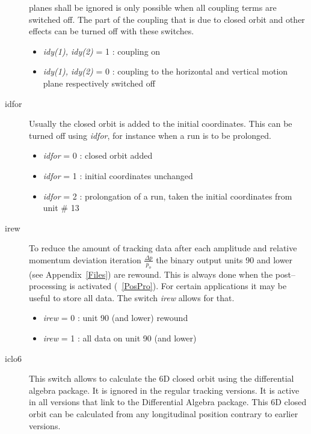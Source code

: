 \documentclass[a4paper,11pt]{report}
\begin{document}
\begin{description}
  planes shall be ignored is only possible when all coupling terms are
  switched off.  The part of the coupling that is due to closed orbit
  and other effects can be turned off with these switches.
 \begin{itemize}
 \item {\em idy(1), idy(2)} \/= 1 : coupling on
 \item {\em idy(1), idy(2)} \/= 0 : coupling to the horizontal and
   vertical motion plane respectively switched off
 \end{itemize}
\item [idfor] Usually the closed orbit is added to the initial
  coordinates. This can be turned off using {\em idfor}\/, for
  instance when a run is to be prolonged.
 \begin{itemize}
 \item {\em idfor} \/= 0 : closed orbit added
 \item {\em idfor} \/= 1 : initial coordinates unchanged
 \item {\em idfor} \/= 2 : prolongation of a run, taken the initial
   coordinates from unit \# 13
 \end{itemize}
\item [irew] To reduce the amount of tracking data after each
  amplitude and relative momentum deviation iteration \mbox{$
    \frac{\Delta p}{p_o} $} the binary output units 90 and lower (see
  Appendix~\ref{Files}) are rewound.  This is always done when the
  post--processing is activated (~\ref{PosPro}). For certain
  applications it may be useful to store all data. The switch {\em
    irew} \/allows for that.
 \begin{itemize}
 \item {\em irew} \/= 0 : unit 90 (and lower) rewound
 \item {\em irew} \/= 1 : all data on unit 90 (and lower)
 \end{itemize}
\item [iclo6] This switch allows to calculate the 6D closed orbit
  using the differential algebra package. It is ignored in the regular
  tracking versions. It is active in all versions that link to the
  Differential Algebra package. This 6D closed orbit can be calculated
  from any longitudinal position contrary to earlier versions.


\end{description}
\end{document}
